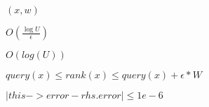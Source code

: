 \documentclass{article}
\begin{document}
$(x,w)$
\pagebreak

$O(\frac{\log{U}}{\epsilon})$
\pagebreak

$O(log(U))$
\pagebreak

$query(x) \leq rank(x) \leq query(x) + \epsilon * W$
\pagebreak

$|this->error - rhs.error| \leq 1e-6$
\pagebreak
\end{document}

